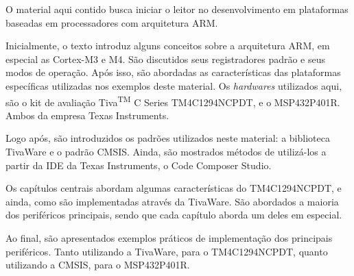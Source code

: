 O material aqui contido busca iniciar o leitor no desenvolvimento em plataformas baseadas em processadores com arquitetura ARM.

Inicialmente, o texto introduz alguns conceitos sobre a arquitetura ARM, em especial as Cortex-M3 e M4. São discutidos seus registradores padrão e seus modos de operação. Após isso, são abordadas as características das plataformas específicas utilizadas nos exemplos deste material. Os \emph{hardwares} utilizados aqui, são o kit de 
avaliação Tiva\textsuperscript{TM} C Series TM4C1294NCPDT, e o MSP432P401R. Ambos da empresa Texas Instruments.

Logo após, são introduzidos os padrões utilizados neste material: a biblioteca TivaWare e o padrão CMSIS. Ainda, são mostrados métodos de utilizá-los a partir da IDE da Texas Instruments, o Code Composer Studio.

Os capítulos centrais abordam algumas características do TM4C1294NCPDT, e ainda, como são implementadas através da TivaWare. São abordados a maioria dos periféricos principais, sendo que cada capítulo aborda um deles em especial.

Ao final, são apresentados exemplos práticos de implementação dos principais periféricos. Tanto utilizando a TivaWare, para o TM4C1294NCPDT, quanto utilizando a CMSIS, para o MSP432P401R.
